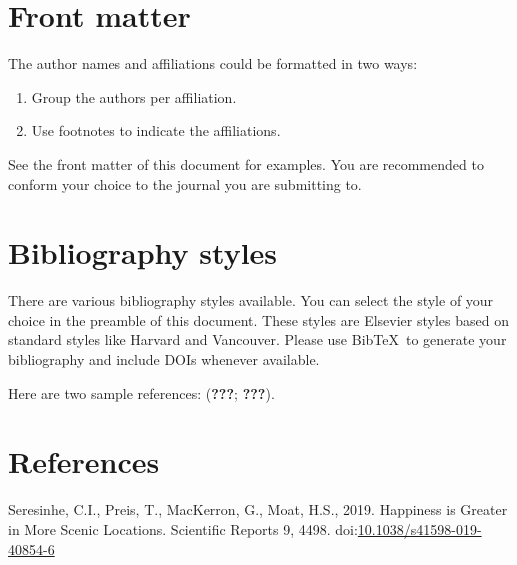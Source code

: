 \documentclass[]{elsarticle} %
\begin{document}
\hypertarget{front-matter}{%
\section{Front matter}\label{front-matter}}

The author names and affiliations could be formatted in two ways:

\begin{enumerate}
\def\labelenumi{(\arabic{enumi})}
\item
  Group the authors per affiliation.
\item
  Use footnotes to indicate the affiliations.
\end{enumerate}

See the front matter of this document for examples. You are recommended
to conform your choice to the journal you are submitting to.

\hypertarget{bibliography-styles}{%
\section{Bibliography styles}\label{bibliography-styles}}

There are various bibliography styles available. You can select the
style of your choice in the preamble of this document. These styles are
Elsevier styles based on standard styles like Harvard and Vancouver.
Please use BibTeX~to generate your bibliography and include DOIs
whenever available.

Here are two sample references: ({\textbf{???}}; {\textbf{???}}).

\hypertarget{references}{%
\section*{References}\label{references}}

\hypertarget{refs}{}
\leavevmode\hypertarget{ref-Seresinhe2019}{}%
Seresinhe, C.I., Preis, T., MacKerron, G., Moat, H.S., 2019. Happiness
is Greater in More Scenic Locations. Scientific Reports 9, 4498.
doi:\href{https://doi.org/10.1038/s41598-019-40854-6}{10.1038/s41598-019-40854-6}
\end{document}
